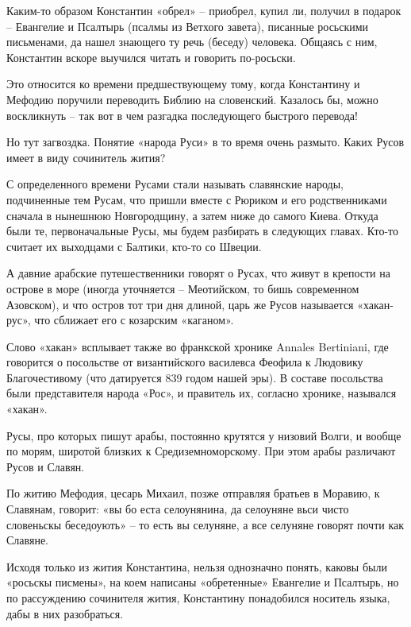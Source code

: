 Каким-то образом Константин «обрел» – приобрел, купил ли, получил в подарок – Евангелие и Псалтырь (псалмы из Ветхого завета), писанные росьскими письменами, да нашел знающего ту речь (беседу) человека. Общаясь с ним, Константин вскоре выучился читать и говорить по-росьски.

Это относится ко времени предшествующему тому, когда Константину и Мефодию поручили переводить Библию на словенский. Казалось бы, можно воскликнуть – так вот в чем разгадка последующего быстрого перевода!

Но тут загвоздка. Понятие «народа Руси» в то время очень размыто. Каких Русов имеет в виду сочинитель жития? 

С определенного времени Русами стали называть славянские народы, подчиненные тем Русам, что пришли вместе с Рюриком и его родственниками сначала в нынешнюю Новгородщину, а затем ниже до самого Киева. Откуда были те, первоначальные Русы, мы будем разбирать в следующих главах. Кто-то считает их выходцами с Балтики, кто-то со Швеции. 

А давние арабские путешественники говорят о Русах, что живут в крепости на острове в море (иногда уточняется – Меотийском, то бишь современном Азовском), и что остров тот три дня длиной, царь же Русов называется «хакан-рус», что сближает его с козарским «каганом». 

Слово «хакан» всплывает также во франкской хронике Annales Bertiniani, где говорится о посольстве от византийского василевса Феофила к Людовику Благочестивому (что датируется 839 годом нашей эры). В составе посольства были представителя народа «Рос», и правитель их, согласно хронике, назывался «хакан». 

Русы, про которых пишут арабы, постоянно крутятся у низовий Волги, и вообще по морям, широтой близких к Средиземноморскому. При этом арабы различают Русов и Славян.

По житию Мефодия, цесарь Михаил, позже отправляя братьев в Моравию, к Славянам, говорит: «вы бо еста селоунянина, да селоуняне вьси чисто словеньскы беседоують» – то есть вы селуняне, а все селуняне говорят почти как Славяне.

Исходя только из жития Константина, нельзя однозначно понять, каковы были «росьскы писмены», на коем написаны «обретенные» Евангелие и Псалтырь, но по рассуждению сочинителя жития, Константину понадобился носитель языка, дабы в них разобраться.


